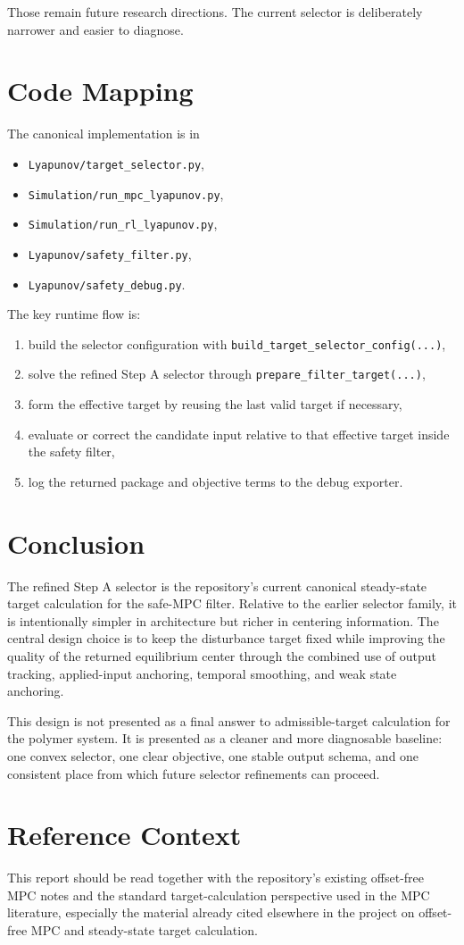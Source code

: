 \documentclass[11pt]{article}
\begin{document}
Those remain future research directions. The current selector is deliberately narrower and easier to diagnose.

\section{Code Mapping}
The canonical implementation is in
\begin{itemize}
\item \texttt{Lyapunov/target\_selector.py},
\item \texttt{Simulation/run\_mpc\_lyapunov.py},
\item \texttt{Simulation/run\_rl\_lyapunov.py},
\item \texttt{Lyapunov/safety\_filter.py},
\item \texttt{Lyapunov/safety\_debug.py}.
\end{itemize}

The key runtime flow is:
\begin{enumerate}[label=\arabic*.]
\item build the selector configuration with \texttt{build\_target\_selector\_config(...)},
\item solve the refined Step A selector through \texttt{prepare\_filter\_target(...)},
\item form the effective target by reusing the last valid target if necessary,
\item evaluate or correct the candidate input relative to that effective target inside the safety filter,
\item log the returned package and objective terms to the debug exporter.
\end{enumerate}

\section{Conclusion}
The refined Step A selector is the repository's current canonical steady-state target calculation for the safe-MPC filter. Relative to the earlier selector family, it is intentionally simpler in architecture but richer in centering information. The central design choice is to keep the disturbance target fixed while improving the quality of the returned equilibrium center through the combined use of output tracking, applied-input anchoring, temporal smoothing, and weak state anchoring.

This design is not presented as a final answer to admissible-target calculation for the polymer system. It is presented as a cleaner and more diagnosable baseline: one convex selector, one clear objective, one stable output schema, and one consistent place from which future selector refinements can proceed.

\section*{Reference Context}
This report should be read together with the repository's existing offset-free MPC notes and the standard target-calculation perspective used in the MPC literature, especially the material already cited elsewhere in the project on offset-free MPC and steady-state target calculation.
\end{document}
